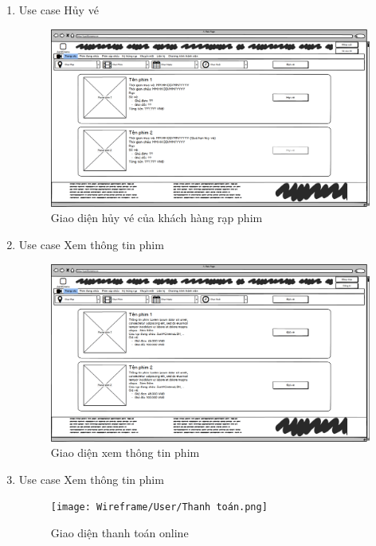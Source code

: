 \documentclass[a4paper, 12pt]{article}
\begin{document}
\begin{enumerate}
        \item Use case Hủy vé
        \begin{figure}[H]
            \begin{center}
                \includegraphics[scale = 0.25]{Wireframe/User/Vé của tôi.png}
                \caption{Giao diện hủy vé của khách hàng rạp phim}
            \end{center}
        \end{figure}

        \item Use case Xem thông tin phim
        \begin{figure}[H]
            \begin{center}
                \includegraphics[scale = 0.25]{Wireframe/User/Phim đang chiếu_ Chọn phim.png}
                \caption{Giao diện xem thông tin phim}
            \end{center}
        \end{figure}

        \item Use case Xem thông tin phim
        \begin{figure}[H]
            \begin{center}
                \texttt{[image: Wireframe/User/Thanh toán.png]}
                \caption{Giao diện thanh toán online}
            \end{center}
        \end{figure}


\end{enumerate}
\end{document}
